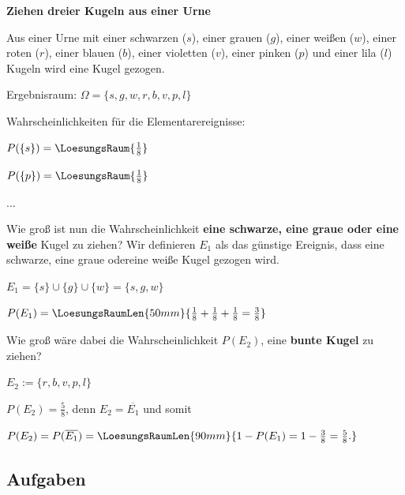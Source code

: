 
\begin{beispiel}{}{}\textbf{Ziehen dreier Kugeln aus einer Urne}

Aus einer Urne mit einer schwarzen ($s$), einer grauen ($g$), einer
weißen ($w$), einer roten ($r$), einer blauen ($b$), einer violetten
($v$), einer pinken ($p$) und einer lila ($l$) Kugeln wird eine Kugel gezogen.

Ergebnisraum: $\Omega = \{s, g, w, r, b, v, p, l\}$


Wahrscheinlichkeiten für die Elementarereignisse:

\noTRAINER{\leserluft\leserluft\leserluft}
$P(\{s\}) = \LoesungsRaum{\frac18}$

\noTRAINER{\leserluft\leserluft\leserluft}
$P(\{p\}) = \LoesungsRaum{\frac18}$

...

\vspace{5mm}
Wie groß ist nun die Wahrscheinlichkeit \textbf{eine schwarze, eine
  graue oder eine weiße} Kugel zu ziehen?
Wir definieren $E_1$ als das günstige Ereignis, dass eine schwarze,
eine graue odereine weiße Kugel gezogen wird.

$E_1 = \{s\} \cup \{g\} \cup \{w\} = \{s,g,w\}$

\vspace{3mm}

$P(E_1) = \LoesungsRaumLen{50mm}{\frac18 + \frac18 + \frac18 = \frac38}$

\vspace{5mm}
Wie groß wäre dabei die Wahrscheinlichkeit $P(E_2)$, eine \textbf{bunte Kugel}
zu ziehen?

$E_2 := \{r, b, v, p, l\}$

$P(E_2) = \frac58$, denn $E_2 = \overline{E_1}$ und somit

\noTRAINER{\leserluft\leserluft}
$P(E_2) = P(\overline{E_1}) = \LoesungsRaumLen{90mm}{1 - P(E_1) = 1 - \frac38 = \frac58 . }$

\end{beispiel}
\newpage

\subsection*{Aufgaben}

